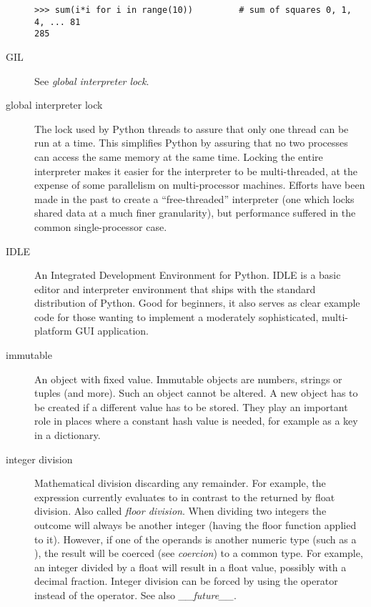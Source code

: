 \begin{description}
\begin{verbatim}
>>> sum(i*i for i in range(10))         # sum of squares 0, 1, 4, ... 81
285
\end{verbatim}

\item[GIL]
See \emph{global interpreter lock}.

\item[global interpreter lock]
The lock used by Python threads to assure that only one thread can be
run at a time.  This simplifies Python by assuring that no two
processes can access the same memory at the same time.  Locking the
entire interpreter makes it easier for the interpreter to be
multi-threaded, at the expense of some parallelism on multi-processor
machines.  Efforts have been made in the past to create a
``free-threaded'' interpreter (one which locks shared data at a much
finer granularity), but performance suffered in the common
single-processor case.

\item[IDLE]
An Integrated Development Environment for Python.  IDLE is a
basic editor and interpreter environment that ships with the standard
distribution of Python.  Good for beginners, it also serves as clear
example code for those wanting to implement a moderately
sophisticated, multi-platform GUI application.

\item[immutable]
An object with fixed value.  Immutable objects are numbers, strings or
tuples (and more).  Such an object cannot be altered.  A new object
has to be created if a different value has to be stored.  They play an
important role in places where a constant hash value is needed, for
example as a key in a dictionary.

\item[integer division]
Mathematical division discarding any remainder.  For example, the
expression  currently evaluates to  in contrast
to the  returned by float division.  Also called
{}\emph{floor division}.  When dividing two integers the outcome will
always be another integer (having the floor function applied to it).
However, if one of the operands is another numeric type (such as a
{}), the result will be coerced (see \emph{coercion}) to
a common type.  For example, an integer divided by a float will result
in a float value, possibly with a decimal fraction.  Integer division
can be forced by using the \code{//} operator instead of the \code{/}
operator.  See also \emph{__future__}.


\end{description}

